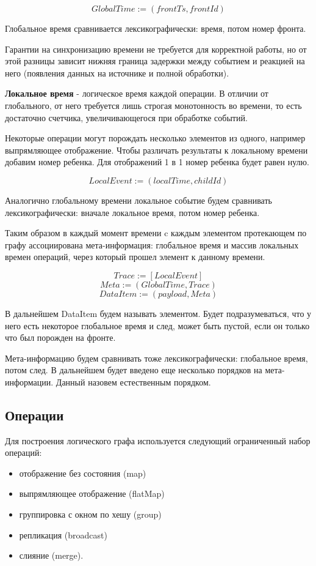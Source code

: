 \documentclass[14pt]{matmex-diploma-custom}
\begin{document}
\[GlobalTime := (frontTs, frontId)\]

Глобальное время сравнивается лексикографически: время, потом номер фронта.

Гарантии на синхронизацию времени не требуется для корректной работы, но от этой разницы зависит нижняя граница задержки между событием и реакцией на него (появления данных на источнике и полной обработки).

\textbf{Локальное время} - логическое время каждой операции. В отличии от глобального, от него требуется лишь строгая монотонность во времени, то есть достаточно счетчика, увеличивающегося при обработке событий.

Некоторые операции могут порождать несколько элементов из одного, например  выпрямляющее отображение. Чтобы различать результаты к локальному времени добавим номер ребенка. Для отображений 1 в 1 номер ребенка будет равен нулю.

\[LocalEvent := (localTime, childId)\]

Аналогично глобальному времени локальное событие будем сравнивать лексикографически: вначале локальное время, потом номер ребенка.

Таким образом в каждый момент времени c каждым элементом протекающем по графу ассоциирована мета-информация: глобальное время и массив локальных времен операций, через который прошел элемент к данному времени.

\[Trace := [LocalEvent]\]
\[Meta := (GlobalTime, Trace)\]
\[DataItem := (payload, Meta)\]

В дальнейшем DataItem будем называть элементом. Будет подразумеваться, что у него есть некоторое глобальное время и след, может быть пустой, если он только что был порожден на фронте.

Мета-информацию будем сравнивать тоже лексикографически: глобальное время, потом след. В дальнейшем будет введено еще несколько порядков на мета-информации. Данный назовем естественным порядком.

\subsection{Операции}

Для построения логического графа используется следующий ограниченный набор операций:

\begin{itemize}
  \item отображение без состояния (map)
  \item выпрямляющее отображение (flatMap)
  \item группировка с окном по хешу (group)
  \item репликация (broadcast)
  \item слияние (merge).
\end{itemize}
\end{document}
